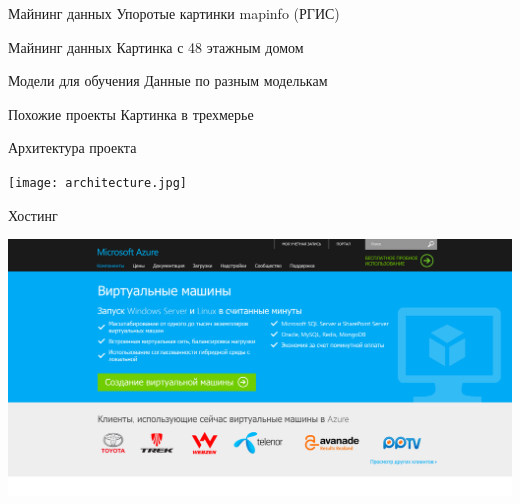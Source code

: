 \documentclass[14pt, fleqn, xcolor={dvipsnames, table}]{beamer}
\begin{document}
        \begin{frame}{Майнинг данных}
            Упоротые картинки mapinfo (РГИС)    
        \end{frame}
        
        \begin{frame}{Майнинг данных}
            Картинка с 48 этажным домом
        \end{frame}
        
        \begin{frame}{Модели для обучения}
            Данные по разным моделькам
        \end{frame}
        
        \begin{frame}{Похожие проекты}
            Картинка в трехмерье
        \end{frame}
        
        \begin{frame}{Архитектура проекта}
            \begin{center}
                \texttt{[image: architecture.jpg]}
            \end{center}
        \end{frame}
        
        \begin{frame}{Хостинг}
            \begin{center}
                \includegraphics[scale=0.25]{azure.png}
            \end{center}
        \end{frame}
        
\end{document}
